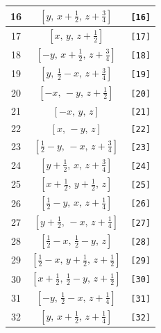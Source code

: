 \documentclass[fleqn,8pt]{jsarticle}
\begin{document}
\begin{longtable}{ccc}
16 & $\left[ y,\, x + \frac{1}{2},\, z + \frac{3}{4} \right]$ & {\tt [16]} \\ \hline
17 & $\left[ x,\, y,\, z + \frac{1}{2} \right]$ & {\tt [17]} \\ \hline
18 & $\left[ - y,\, x + \frac{1}{2},\, z + \frac{3}{4} \right]$ & {\tt [18]} \\ \hline
19 & $\left[ y,\, \frac{1}{2} - x,\, z + \frac{3}{4} \right]$ & {\tt [19]} \\ \hline
20 & $\left[ - x,\, - y,\, z + \frac{1}{2} \right]$ & {\tt [20]} \\ \hline
21 & $\left[ - x,\, y,\, z \right]$ & {\tt [21]} \\ \hline
22 & $\left[ x,\, - y,\, z \right]$ & {\tt [22]} \\ \hline
23 & $\left[ \frac{1}{2} - y,\, - x,\, z + \frac{3}{4} \right]$ & {\tt [23]} \\ \hline
24 & $\left[ y + \frac{1}{2},\, x,\, z + \frac{3}{4} \right]$ & {\tt [24]} \\ \hline
25 & $\left[ x + \frac{1}{2},\, y + \frac{1}{2},\, z \right]$ & {\tt [25]} \\ \hline
26 & $\left[ \frac{1}{2} - y,\, x,\, z + \frac{1}{4} \right]$ & {\tt [26]} \\ \hline
27 & $\left[ y + \frac{1}{2},\, - x,\, z + \frac{1}{4} \right]$ & {\tt [27]} \\ \hline
28 & $\left[ \frac{1}{2} - x,\, \frac{1}{2} - y,\, z \right]$ & {\tt [28]} \\ \hline
29 & $\left[ \frac{1}{2} - x,\, y + \frac{1}{2},\, z + \frac{1}{2} \right]$ & {\tt [29]} \\ \hline
30 & $\left[ x + \frac{1}{2},\, \frac{1}{2} - y,\, z + \frac{1}{2} \right]$ & {\tt [30]} \\ \hline
31 & $\left[ - y,\, \frac{1}{2} - x,\, z + \frac{1}{4} \right]$ & {\tt [31]} \\ \hline
32 & $\left[ y,\, x + \frac{1}{2},\, z + \frac{1}{4} \right]$ & {\tt [32]} \\
\end{longtable}
\end{document}
